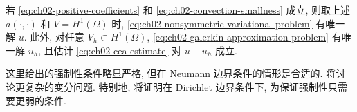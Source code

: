 \setcounter{thmcount}{3}
\begin{Theorem}
\label{thm:ch02-nonsymmetric-higher-dimensional}
若 \eqref{eq:ch02-positive-coefficients} 和 \eqref{eq:ch02-convection-smallness} 成立, 则取上述 $a(\cdot,\cdot)$ 和 $V=H^1(\Omega)$ 时, \eqref{eq:ch02-nonsymmetric-variational-problem} 有唯一解 $u$. 此外, 对任意 $V_h\subset H^1(\Omega)$, \eqref{eq:ch02-galerkin-approximation-problem} 有唯一解 $u_h$, 且估计 \eqref{eq:ch02-cea-estimate} 对 $u-u_h$ 成立.
\end{Theorem}

这里给出的强制性条件略显严格, 但在 Neumann 边界条件的情形是合适的.  将讨论更复杂的变分问题. 特别地, 将证明在 Dirichlet 边界条件下, 为保证强制性只需要更弱的条件.


